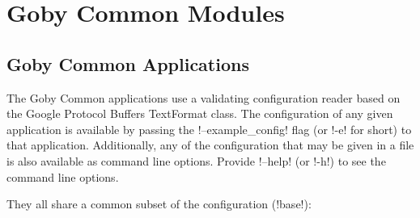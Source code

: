 \chapter{Goby Common Modules}\label{chap:common}
\MakeShortVerb{\!} %

\section{Goby Common Applications}\label{sec:base_cfg}

The Goby Common applications use a validating configuration reader based on the Google Protocol Buffers TextFormat class. The configuration of any given application is available by passing the !--example_config! flag (or !-e! for short) to that application. Additionally, any of the configuration that may be given in a file is also available as command line options. Provide !--help! (or !-h!) to see the command line options.

They all share a common subset of the configuration (!base!):

\resetbvlinenumber

